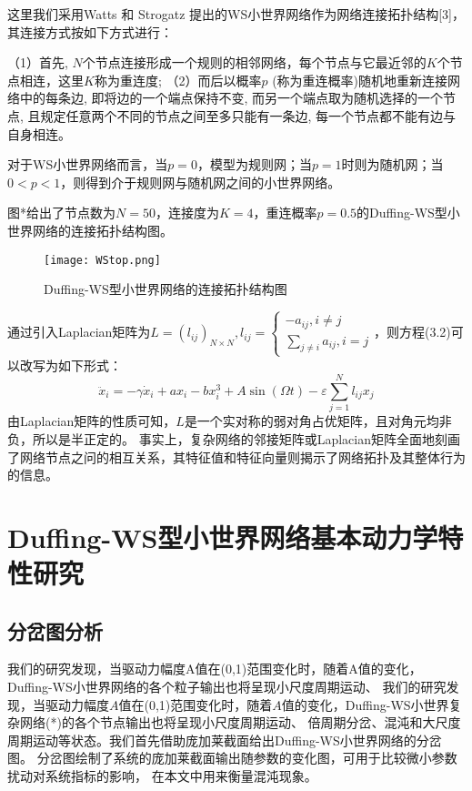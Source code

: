 这里我们采用Watts 和 Strogatz 提出的WS小世界网络作为网络连接拓扑结构[3]，其连接方式按如下方式进行：

（1）首先, $N$个节点连接形成一个规则的相邻网络，每个节点与它最近邻的$K$个节点相连，这里$K$称为重连度;
（2）而后以概率$p$ (称为重连概率)随机地重新连接网络中的每条边,
即将边的一个端点保持不变, 而另一个端点取为随机选择的一个节点, 且规定任意两个不同的节点之间至多只能有一条边, 每一个节点都不能有边与自身相连。

对于WS小世界网络而言，当$p = 0$，模型为规则网；当$p = 1$时则为随机网；当$0 < p < 1$，则得到介于规则网与随机网之间的小世界网络。

图*给出了节点数为$N=50$，连接度为$K = 4$，重连概率$p = 0.5$的Duffing-WS型小世界网络的连接拓扑结构图。
\begin{figure}[!htbp]
   \centering
   \texttt{[image: WStop.png]}\caption{Duffing-WS型小世界网络的连接拓扑结构图}
\end{figure}
通过引入Laplacian矩阵为$L=\left(l_{ij}\right)_{N\times N},l_{ij}=\begin{cases}
    -a_{ij},i\neq j \\ \sum_{j\neq i}a_{ij},i=j
\end{cases}$，则方程(3.2)可以改写为如下形式：
\begin{equation}
    \ddot{x}_{i}=-\gamma \dot{x}_{i}+a x_{i}-b x_{i}^{3}+A \sin (\Omega t)-\varepsilon\sum_{j=1}^{N} l_{i j} x_{j}
\end{equation}
由Laplacian矩阵的性质可知，$L$是一个实对称的弱对角占优矩阵，且对角元均非负，所以是半正定的。
事实上，复杂网络的邻接矩阵或Laplacian矩阵全面地刻画了网络节点之问的相互关系，其特征值和特征向量则揭示了网络拓扑及其整体行为的信息。

\section{Duffing-WS型小世界网络基本动力学特性研究}
\subsection{分岔图分析}
我们的研究发现，当驱动力幅度A值在(0,1)范围变化时，随着A值的变化，Duffing-WS小世界网络的各个粒子输出也将呈现小尺度周期运动、
我们的研究发现，当驱动力幅度$A$值在(0,1)范围变化时，随着$A$值的变化，Duffing-WS小世界复杂网络(*)的各个节点输出也将呈现小尺度周期运动、
倍周期分岔、混沌和大尺度周期运动等状态。我们首先借助庞加莱截面给出Duffing-WS小世界网络的分岔图。 分岔图绘制了系统的庞加莱截面输出随参数的变化图，可用于比较微小参数扰动对系统指标的影响，
在本文中用来衡量混沌现象。

